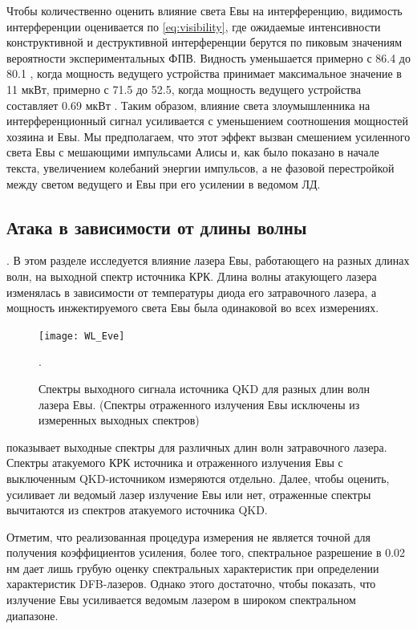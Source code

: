 Чтобы количественно оценить влияние света Евы на интерференцию, видимость интерференции оценивается по \cref{eq:visibility}, где ожидаемые интенсивности конструктивной и деструктивной интерференции берутся по пиковым значениям вероятности экспериментальных ФПВ. Видность уменьшается примерно с 86.4 до 80.1 , когда мощность ведущего устройства принимает максимальное значение в 11 мкВт, примерно с 71.5 до 52.5, когда мощность ведущего устройства составляет 0.69 мкВт . Таким образом, влияние света злоумышленника на интерференционный сигнал усиливается с уменьшением соотношения мощностей хозяина и Евы. Мы предполагаем, что этот эффект вызван смешением усиленного света Евы с мешающими импульсами Алисы и, как было показано в начале текста, увеличением колебаний энергии импульсов, а не фазовой перестройкой между светом ведущего и Евы при его усилении в ведомом ЛД.
\subsection{Атака в зависимости от длины волны}.
В этом разделе исследуется влияние лазера Евы, работающего на разных длинах волн, на выходной спектр источника КРК. Длина волны атакующего лазера изменялась в зависимости от температуры диода его затравочного лазера, а мощность инжектируемого света Евы была одинаковой во всех измерениях.

\begin{figure}
\texttt{[image: WL\_Eve]}
\caption{Спектры выходного сигнала источника QKD для разных длин волн лазера Евы. (Спектры отраженного излучения Евы исключены из измеренных выходных спектров)}.
\label{fig:WL_Eve}
\end{figure}

 показывает выходные спектры для различных длин волн затравочного лазера. Спектры атакуемого КРК источника и отраженного излучения Евы с выключенным QKD-источником измеряются отдельно. Далее, чтобы оценить, усиливает ли ведомый лазер излучение Евы или нет, отраженные спектры вычитаются из спектров атакуемого источника QKD.

Отметим, что реализованная процедура измерения не является точной для получения коэффициентов усиления, более того, спектральное разрешение в 0.02 нм  дает лишь грубую оценку спектральных характеристик при определении характеристик DFB-лазеров. Однако этого достаточно, чтобы показать, что излучение Евы усиливается ведомым лазером в широком спектральном диапазоне.

